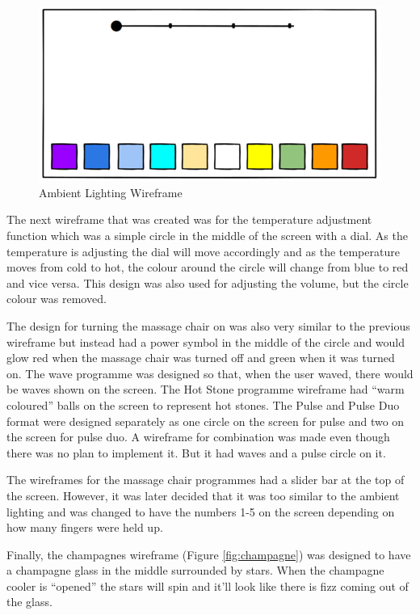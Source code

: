 \documentclass{l4proj}
\begin{document}
\begin{figure}[!htb]
    \centering
    \includegraphics[scale = 0.5]{images/ambientLighting.png}
    \caption{Ambient Lighting Wireframe}
    \label{fig:ambientLighting}
\end{figure}

The next wireframe that was created was for the temperature adjustment function which was a simple circle in the middle of the screen with a dial. As the temperature is adjusting the dial will move accordingly and as the temperature moves from cold to hot, the colour around the circle will change from blue to red and vice versa. This design was also used for adjusting the volume, but the circle colour was removed.

The design for turning the massage chair on was also very similar to the previous wireframe but instead had a power symbol in the middle of the circle and would glow red when the massage chair was turned off and green when it was turned on.
The wave programme was designed so that, when the user waved, there would be waves shown on the screen.
The Hot Stone programme wireframe had “warm coloured” balls on the screen to represent hot stones. The Pulse and Pulse Duo format were designed separately as one circle on the screen for pulse and two on the screen for pulse duo.
A wireframe for combination was made even though there was no plan to implement it. But it had waves and a pulse circle on it. 

The wireframes for the massage chair programmes had a slider bar at the top of the screen. However, it was later decided that it was too similar to the ambient lighting and was changed to have the numbers 1-5 on the screen depending on how many fingers were held up.

Finally, the champagnes wireframe (Figure \ref{fig:champagne}) was designed to have a champagne glass in the middle surrounded by stars. When the champagne cooler is “opened” the stars will spin and it’ll look like there is fizz coming out of the glass.
\end{document}
